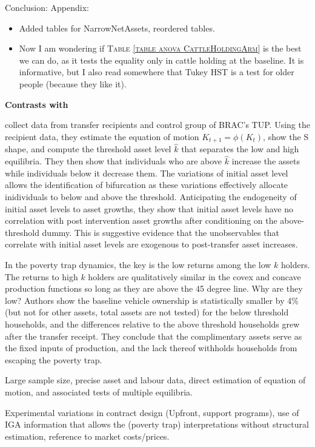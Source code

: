 Conclusion:
Appendix:
\begin{itemize}
\vspace{1.0ex}\setlength{\itemsep}{1.0ex}\setlength{\baselineskip}{12pt}
\item	Added tables for \textsf{NarrowNetAssets}, reordered tables.
\item	Now I am wondering if \textsc{\normalsize Table \ref{table anova CattleHoldingArm}} is the best we can do, as it tests the equality only in cattle holding at the baseline. It is informative, but I also read somewhere that Tukey HST is a test for older people (because they like it).
\end{itemize}

\textbf{\textbf{Contrasts with \citet{Balboni2020}}}
\setlength{\parindent}{1em}

	\citet{Balboni2020} collect data from transfer recipients and control group of BRAC's TUP. Using the recipient data, they estimate the equation of motion $K_{t+1}=\phi(K_{t})$, show the S shape, and compute the threshold asset level $\hat{k}$ that separates the low and high equilibria. They then show that individuals who are above $\hat{k}$ increase the assets while individuals below it decrease them. The variations of initial asset level allows the identification of bifurcation as these variations effectively allocate inidividuals to below and above the threshold. Anticipating the endogeneity of initial asset levels to asset growths, they show that initial asset levels have no correlation with post intervention asset growths after conditioning on the above-threshold dummy. This is suggestive evidence that the unobservables that correlate with initial asset levels are exogenous to post-transfer asset increases.

	In the poverty trap dynamics, the key is the low returns among the low $k$ holders. The returns to high $k$ holders are qualitatively similar in the covex and concave production functions so long as they are above the 45 degree line. Why are they low? Authors show the baseline vehicle ownership is statistically smaller by 4\% (but not for other assets, total assets are not tested) for the below threshold households, and the differences relative to the above threshold households grew after the transfer receipt. They conclude that the complimentary assets serve as the fixed inputs of production, and the lack thereof withholds households from escaping the poverty trap.

\begin{description}
\vspace{1.0ex}\setlength{\itemsep}{1.0ex}\setlength{\baselineskip}{12pt}
\item[their strength]	Large sample size, precise asset and labour data, direct estimation of equation of motion, and associated tests of multiple equilibria.
\item[our strength]	Experimental variations in contract design (\textsf{Upfront}, support programs), use of IGA information that allows the (poverty trap) interpretations without structural estimation, reference to market costs/prices. 
\end{description}

